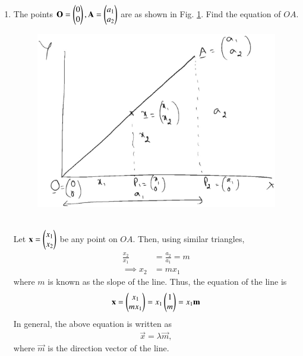 \renewcommand{\theequation}{\theenumi}
\begin{enumerate}[label=\arabic*.,ref=\thesubsection.\theenumi]
\item The points $\mathbf{O}=\begin{pmatrix}0\\0\end{pmatrix},\mathbf{A}=\begin{pmatrix}a_1\\a_2\end{pmatrix}$ are as shown in Fig. \ref{fig:line_homog}. 
Find the equation of  $OA$. 
\begin{figure}
\centering
\includegraphics[width=\columnwidth]{./figs/line_homog.eps}
\caption{}
\label{fig:line_homog}
\end{figure}
\\
\solution
Let $\mathbf{x}=\begin{pmatrix}x_1\\x_2\end{pmatrix}$ be any point on $OA$.
Then, using similar triangles,
\begin{align}
\frac{x_2}{x_1} &= \frac{a_2}{a_1} = m
\\
\implies x_2 &=  m x_1
\end{align}
where $m$ is known as the slope of the line. Thus, the equation of the line is
\begin{align}
\mathbf{x} = \begin{pmatrix}x_1\\m x_1\end{pmatrix} = x_1 \begin{pmatrix}1 \\ m\end{pmatrix} = x_1\mathbf{m}
\end{align}
In general, the above equation is written as
\begin{align}
\label{eq:homog}
\vec{x} = \lambda \vec{m},
\end{align}
%
where $\vec{m}$ is the direction vector of the line.


\end{enumerate}
